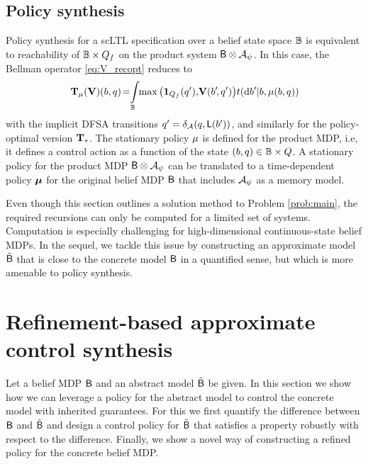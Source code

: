 \documentclass{ifacconf}
\newcommand{\red}[1]{{\color{red} #1}}
\begin{document}
\subsection{Policy synthesis}
Policy synthesis for a scLTL specification over a belief state space $\mathbb{B}$ is equivalent to reachability of $\mathbb{B}\times Q_f$ on the product system $\mathsf{B} \otimes \mathcal{A}_\psi$. In this case, the Bellman operator \eqref{eq:V_recopt} reduces to
\begin{equation}
\label{eq:V_recopt_inf_mu}
  \Bel_\pol (\mathbf V)(b,q)\! = \hspace{-1mm} \int_{\Xb} \hspace{-1mm} \max \left( \mathbf 1_{Q_f}(q'), \!\mathbf V( b'\!, q') \right)\! {\tr}(\mathrm{d} b' |b,\pol(b,q))\!
\end{equation}
with {\color{orange}the implicit DFSA transitions  $q' =\delta_{\mathcal{A}}(q,\mathsf{L}(b'))$}, %
and similarly for the policy-optimal version ${\mathbf {T}}_\ast$. The stationary policy ${\mu}$ is defined for the product MDP, i.e, it defines a control action as a function of the state $(b,q) \in \mathbb{B} \times Q$.  A stationary policy %
for the product MDP $\mathsf{B} \otimes \mathcal{A}_\psi$ can be translated to a time-dependent policy ${\boldsymbol{\mu}}$ for the original belief MDP $\mathsf{B}$ that includes $\mathcal{A}_\psi$ as a memory model.

Even though this section outlines a solution method to Problem \ref{prob:main}, the required recursions can only be computed for a limited set of systems.
Computation is especially challenging for high-dimensional continuous-state belief MDPs. In the sequel, we tackle this issue by constructing an approximate model $\tilde {\mathsf{B}}$ that is close to the concrete model $\mathsf{B}$ in a quantified sense, but which is more amenable to policy synthesis.


\section{Refinement-based approximate control synthesis}
\label{sec:refinement}

Let a belief MDP $\mathsf{B}$ and an abstract model $\tilde {\mathsf{B}}$ be given. In this section we show how we can leverage a policy for the abstract model to control the concrete model with inherited guarantees. For this we first quantify the difference between $\mathsf{B}$ and $\tilde {\mathsf{B}}$ and design a control policy for $\tilde {\mathsf{B}}$ that satisfies a property robustly with respect to the difference. Finally, we show a novel way of constructing a refined policy for the concrete belief MDP.
\end{document}
